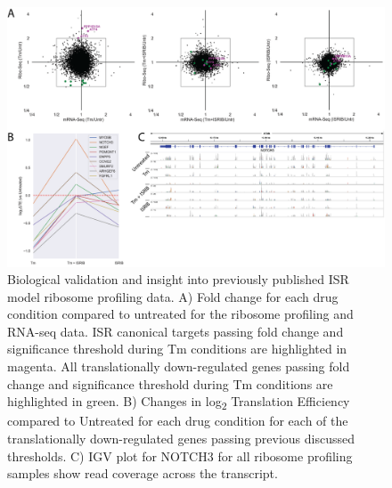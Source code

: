 \documentclass[11pt, a4paper, oneside]{article}
\begin{document}
\begin{figure}
\centering
  \includegraphics[width=180mm]{figures/xpresspipe_figure3.png}
  \caption{Biological validation and insight into previously published ISR model ribosome profiling data. A) Fold change for each drug condition compared to untreated for the ribosome profiling and RNA-seq data. ISR canonical targets passing fold change and significance threshold during Tm conditions are highlighted in magenta. All translationally down-regulated genes passing fold change and significance threshold during Tm conditions are highlighted in green. B) Changes in log\textsubscript{2} Translation Efficiency compared to Untreated for each drug condition for each of the translationally down-regulated genes passing previous discussed thresholds. C) IGV plot for NOTCH3 for all ribosome profiling samples show read coverage across the transcript.}
  \label{fig:figure3}
\end{figure}
\end{document}
